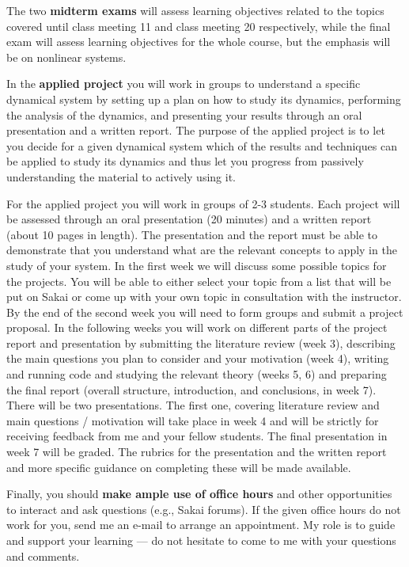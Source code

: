\documentclass[11pt]{article}
\begin{document}
The two \textbf{midterm exams} will assess learning objectives related to the topics covered until class meeting 11 and class meeting 20 respectively, while the final exam will assess learning objectives for the whole course, but the emphasis will be on nonlinear systems.

In the \textbf{applied project} you will work in groups to understand a specific dynamical system by setting up a plan on how to study its dynamics, performing the analysis of the dynamics, and presenting your results through an oral presentation and a written report. The purpose of the applied project is to let you decide for a given dynamical system which of the results and techniques can be applied to study its dynamics and thus let you progress from passively understanding the material to actively using it. 

For the applied project you will work in groups of 2-3 students. Each project will be assessed through an oral presentation (20 minutes) and a written report (about 10 pages in length). The presentation and the report must be able to demonstrate that you understand what are the relevant concepts to apply in the study of your system.  In the first week we will discuss some possible topics for the projects. You will be able to either select your topic from a list that will be put on Sakai or come up with your own topic in consultation with the instructor. By the end of the second week you will need to form groups and submit a project proposal. In the following weeks you will work on different parts of the project report and presentation by submitting the literature review (week 3), describing the main questions you plan to consider and your motivation (week 4), writing and running code and studying the relevant theory (weeks 5, 6) and preparing the final report (overall structure, introduction, and conclusions, in week 7). There will be two presentations. The first one, covering literature review and main questions / motivation will take place in week 4 and will be strictly for receiving feedback from me and your fellow students. The final presentation in week 7 will be graded. The rubrics for the presentation and the written report and more specific guidance on completing these will be made available.

Finally, you should \textbf{make ample use of office hours} and other opportunities to interact and ask questions (e.g., Sakai forums). If the given office hours do not work for you, send me an e-mail to arrange an appointment. My role is to guide and support your learning — do not hesitate to come to me with your questions and comments.
\end{document}
